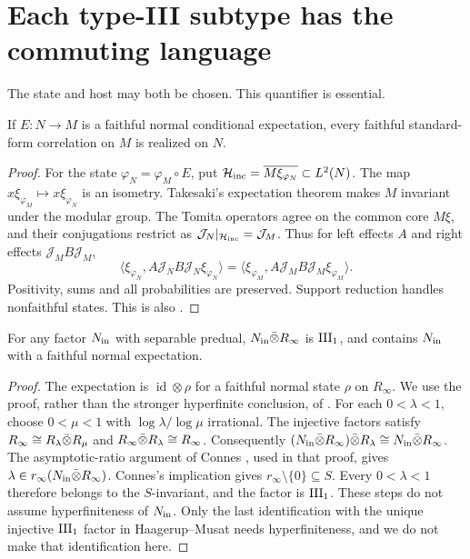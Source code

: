 
\section{Each type-III subtype has the commuting language}\label{sec:typeIII}
The state and host may both be chosen. This quantifier is essential.

\begin{backgroundlemma}
If $E:N\to M$ is a faithful normal conditional expectation, every
faithful standard-form correlation on $M$ is realized on $N$.
\end{backgroundlemma}
\begin{proof}
For the state $\varphi_N=\varphi_M\circ E$, put
$\mathcal H_{\rm inc}=\overline{M\xi_{\varphi_N}}\subset L^2(N)$.
The map $x\xi_{\varphi_M}\mapsto x\xi_{\varphi_N}$ is an isometry.
Takesaki's expectation theorem \cite{Takesaki} makes $M$ invariant
under the modular group. The Tomita operators agree on the common
core $M\xi$, and their conjugations restrict as $\mathcal J_N|_{\mathcal H_{\rm inc}}=\mathcal J_M$.
Thus for left effects $A$ and right effects $\mathcal J_MB\mathcal J_M$,
\[
 \langle\xi_{\varphi_N},A \mathcal J_NB\mathcal J_N\xi_{\varphi_N}\rangle
 =\langle\xi_{\varphi_M},A \mathcal J_MB\mathcal J_M\xi_{\varphi_M}\rangle.
\]
Positivity, sums and all probabilities are preserved. Support
reduction handles nonfaithful states. This is also
\cite[Lemma 3.1]{ReadType}.
\end{proof}

\begin{lemma}\label{lem:absorb}
For any factor $N_{\rm in}$ with separable predual, $N_{\rm in}\bar\otimes R_\infty$ is
$\mathrm{III}_1$, and contains $N_{\rm in}$ with a faithful normal expectation.
\end{lemma}
\begin{proof}
The expectation is $\operatorname{id}\otimes\rho$ for a faithful normal
state $\rho$ on $R_\infty$.
We use the proof, rather than the stronger hyperfinite conclusion,
of \cite[Lemma 3.8]{HM}.
For each $0<\lambda<1$, choose $0<\mu<1$ with
$\log\lambda/\log\mu$ irrational.
The injective factors satisfy
$R_\infty\cong R_\lambda\bar\otimes R_\mu$ and
$R_\infty\bar\otimes R_\lambda\cong R_\infty$.
Consequently $(N_{\rm in}\bar\otimes R_\infty)\bar\otimes R_\lambda
\cong N_{\rm in}\bar\otimes R_\infty$.
The asymptotic-ratio argument of Connes \cite[Section 3.6]{Connes}, used in that proof, gives
$\lambda\in r_\infty(N_{\rm in}\bar\otimes R_\infty)$.
Connes's implication \cite[Theorem 3.6.1]{Connes} gives
$r_\infty\setminus\{0\}\subseteq S$.
Every $0<\lambda<1$ therefore belongs to the $S$-invariant, and the
factor is $\mathrm{III}_1$. These steps do not assume hyperfiniteness of $N_{\rm in}$.
Only the last identification with the unique injective $\mathrm{III}_1$
factor in Haagerup--Musat needs hyperfiniteness, and we do not make
that identification here.
\end{proof}

